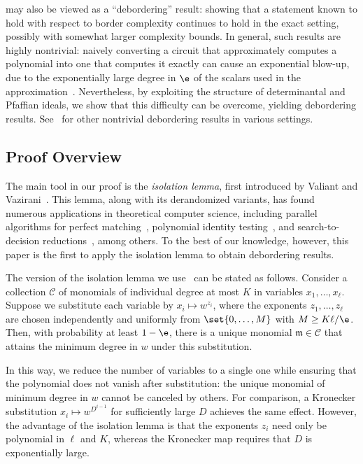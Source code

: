 \documentclass[letterpaper, 11pt]{amsart}
\begin{document}
 may also be viewed as a ``debordering'' result: showing that a statement known to hold with respect to border complexity continues to hold in the exact setting, possibly with somewhat larger complexity bounds.
In general, such results are highly nontrivial: naively converting a circuit that approximately computes a polynomial into one that computes it exactly can cause an exponential blow-up, due to the exponentially large degree in $\e$ of the scalars used in the approximation~\cite{LL89,Bur00}.
Nevertheless, by exploiting the structure of determinantal and Pfaffian ideals, we show that this difficulty can be overcome, yielding debordering results.
See~\cite{DDS22,BDS24,DGIJL24,Shp25} for other nontrivial debordering results in various settings.

\subsection{Proof Overview}

The main tool in our proof is the \emph{isolation lemma}, first introduced by Valiant and Vazirani~\cite{VV86}.
This lemma, along with its derandomized variants, has found numerous applications in theoretical computer science, including parallel algorithms for perfect matching~\cite{MVV87,FGT19,ST17}, polynomial identity testing~\cite{KS01,AMS10,GT20}, and search-to-decision reductions~\cite{VV86,BCGL92,GGR24}, among others.
To the best of our knowledge, however, this paper is the first to apply the isolation lemma to obtain debordering results.

The version of the isolation lemma we use~\cite{KS01} can be stated as follows.
Consider a collection $\mathcal{C}$ of monomials of individual degree at most $K$ in variables $x_1,\dots,x_\ell$.
Suppose we substitute each variable by $x_i \mapsto w^{z_i}$, where the exponents $z_1,\dots,z_\ell$ are chosen independently and uniformly from $\set{0, \dots ,M}$ with $M \geq K\ell/\e$.
Then, with probability at least $1-\e$, there is a unique monomial $\mathfrak{m} \in \mathcal{C}$ that attains the minimum degree in $w$ under this substitution.

In this way, we reduce the number of variables to a single one while ensuring that the polynomial does not vanish after substitution: the unique monomial of minimum degree in $w$ cannot be canceled by others.
For comparison, a Kronecker substitution $x_i \mapsto w^{D^{i-1}}$ for sufficiently large $D$ achieves the same effect.
However, the advantage of the isolation lemma is that the exponents $z_i$ need only be polynomial in $\ell$ and $K$, whereas the Kronecker map requires that $D$ is exponentially large.
\end{document}
